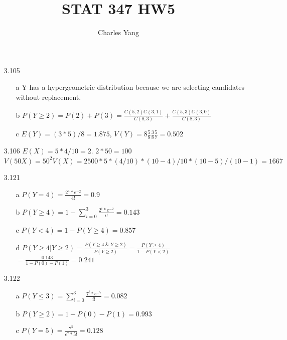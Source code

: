 \documentclass[11pt]{article}
\title{STAT 347 HW5}
\author{Charles Yang}
\begin{document}
    \maketitle

    \begin{enumerate}

        \item[3.105]
        \begin{enumerate}
            \item[a] Y has a hypergeometric distribution because we are selecting candidates without replacement.
            \item[b] $P(Y \geq 2) = P(2) + P(3) = \frac{C(5, 2)C(3, 1)}{C(8, 3)} + \frac{C(5, 3)C(3, 0)}{C(8, 3)}$
            \item[c] $E(Y) = (3*5)/8 = 1.875$, $V(Y) = 8 \frac{5}{8} \frac{3}{8} \frac{5}{7} = 0.502$
        \end{enumerate}

        \item[3.106] $E(X) = 5*4/10 = 2$. $2 * 50 = 100$ \\
                     $V(50X) = 50^2 V(X) = 2500 * 5 * (4/10) * (10-4)/10 * (10 - 5)/(10 - 1) = 1667$

        \item[3.121]
        \begin{enumerate}
            \item[a] $P(Y = 4) = \frac{2^4*e^{-2}}{4!} = 0.9$
            \item[b] $P(Y \geq 4) = 1 - \sum_{i = 0}^3 \frac{2^i*e^{-2}}{i!} = 0.143$
            \item[c] $P(Y < 4) = 1 - P(Y \geq 4) = 0.857$
            \item[d] $P(Y \geq 4 | Y \geq 2) = \frac{P(Y \geq 4 \;\&\; Y \geq 2)}{P(Y \geq 2)} = \frac{P(Y \geq 4)}{1 - P(Y < 2)}$ \\
                     $= \frac{0.143}{1 - P(0) - P(1)} = 0.241$
        \end{enumerate}

        \item[3.122]
        \begin{enumerate}
            \item[a] $P(Y \leq 3) = \sum_{i = 0}^3 \frac{7^i*e^{-7}}{i!} = 0.082$
            \item[b] $P(Y \geq 2) = 1 - P(0) - P(1) = 0.993$
            \item[c] $P(Y = 5) = \frac{7^5}{e^7*5!} = 0.128$
        \end{enumerate}


\end{enumerate}
\end{document}
